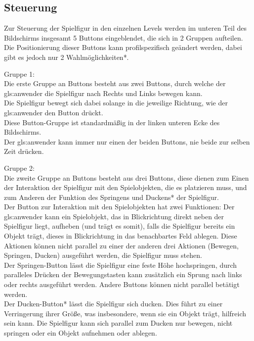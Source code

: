 \documentclass{scrartcl}
\begin{document}
\subsection{Steuerung}  \label{subsection:Steuerung}

Zur Steuerung der Spielfigur in den einzelnen Levels werden im unteren Teil des Bildschirms insgesamt 5 Buttons eingeblendet, die sich in 2 Gruppen aufteilen.\\
Die Positionierung dieser Buttons kann profilspezifisch geändert werden, dabei gibt es jedoch nur 2 Wahlmöglichkeiten*.\\

\begin{enumerate}
	\begin{minipage}{1\textwidth}
			\item Gruppe 1:\\
			Die erste Gruppe an Buttons besteht aus zwei Buttons, durch welche der \gls{gls:anwender} die Spielfigur nach Rechts und Links bewegen kann.\\
			Die Spielfigur bewegt sich dabei solange in die jeweilige Richtung, wie der \gls{gls:anwender} den Button drückt.\\
			Diese Button-Gruppe ist standardmäßig in der linken unteren Ecke des Bildschirms.\\
			Der \gls{gls:anwender} kann immer nur einen der beiden Buttons, nie beide zur selben Zeit drücken.\\
	\end{minipage}
	
	\begin{minipage}{1\textwidth}
			\item Gruppe 2:\\
			Die zweite Gruppe an Buttons besteht aus drei Buttons, diese dienen zum Einen der Interaktion der Spielfigur mit den Spielobjekten, die es platzieren muss, und zum Anderen der Funktion des Springens und Duckens* der Spielfigur.\\
			Der Button zur Interaktion mit den Spielobjekten hat zwei Funktionen: Der \gls{gls:anwender} kann ein Spielobjekt, das in Blickrichtung direkt neben der Spielfigur liegt, aufheben (und trägt es somit), falls die Spielfigur bereits ein Objekt trägt, dieses in Blickrichtung in das benachbartes Feld ablegen. Diese Aktionen können nicht parallel zu einer der anderen drei Aktionen (Bewegen, Springen, Ducken) ausgeführt werden, die Spielfigur muss stehen.\\
			Der Springen-Button lässt die Spielfigur eine feste Höhe hochspringen, durch paralleles Drücken der Bewegungstasten kann zusätzlich ein Sprung nach links oder rechts ausgeführt werden. Andere Buttons können nicht parallel betätigt werden.\\
			Der Ducken-Button* lässt die Spielfigur sich ducken. Dies führt zu einer Verringerung ihrer Größe, was insbesondere, wenn sie ein Objekt trägt, hilfreich sein kann. Die Spielfigur kann sich parallel zum Ducken nur bewegen, nicht springen oder ein Objekt aufnehmen oder ablegen.\\
	\end{minipage}


\end{enumerate}
\end{document}
